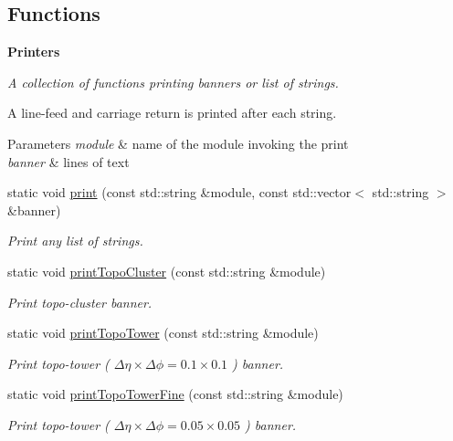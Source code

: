 \subsection*{Functions}
\begin{Indent}{\bf Printers}\par
{\em A collection of functions printing banners or list of strings.

A line-\/feed and carriage return is printed after each string.


\begin{DoxyParams}{Parameters}
{\em module} & name of the module invoking the print \\
\hline
{\em banner} & lines of text \\
\hline
\end{DoxyParams}
}\begin{DoxyCompactItemize}
\item 
static void \hyperlink{namespaceAnalysis_1_1Banner_a5c24f8135036c4f91da82124b65cc108}{print} (const std\+::string \&module, const std\+::vector$<$ std\+::string $>$ \&banner)
\begin{DoxyCompactList}\small\item\em Print any list of strings. \end{DoxyCompactList}\item 
static void \hyperlink{namespaceAnalysis_1_1Banner_a5ee1340f2640f11e204af4eb2f704745}{print\+Topo\+Cluster} (const std\+::string \&module)
\begin{DoxyCompactList}\small\item\em Print topo-\/cluster banner. \end{DoxyCompactList}\item 
static void \hyperlink{namespaceAnalysis_1_1Banner_a851db5eaedf96ef99e7ca109e27288e2}{print\+Topo\+Tower} (const std\+::string \&module)
\begin{DoxyCompactList}\small\item\em Print topo-\/tower ( $ \Delta\eta\times\Delta\phi = 0.1\times 0.1 $ ) banner. \end{DoxyCompactList}\item 
static void \hyperlink{namespaceAnalysis_1_1Banner_a45f4f0c5ea5f9bda4915a909828f3e1a}{print\+Topo\+Tower\+Fine} (const std\+::string \&module)
\begin{DoxyCompactList}\small\item\em Print topo-\/tower ( $ \Delta\eta\times\Delta\phi = 0.05\times 0.05 $ ) banner. \end{DoxyCompactList}\end{DoxyCompactItemize}
\end{Indent}



